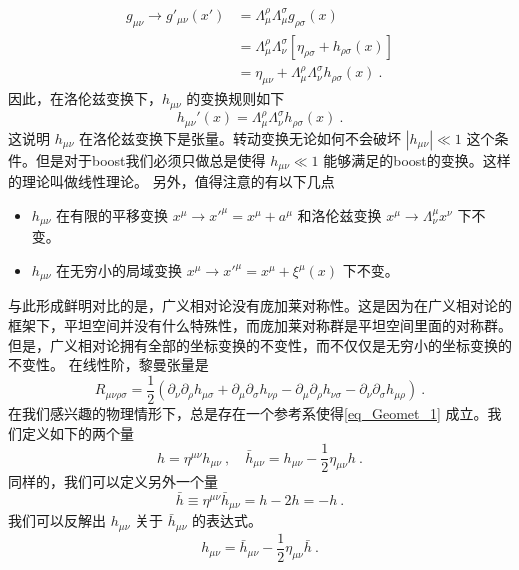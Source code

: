 \begin{equation} 
\begin{aligned}
g_{\mu\nu} \rightarrow g'_{\mu\nu} (x') & = \Lambda^\rho_\mu \Lambda^\sigma_\mu g_{\rho\sigma} (x) \\ 
& = \Lambda^\rho_\mu \Lambda^\sigma_\nu [\eta_{\rho\sigma} + h_{\rho\sigma}(x)] \\
& = \eta_{\mu\nu} + \Lambda^\rho_\mu \Lambda^\sigma_\nu h_{\rho\sigma} (x) ~.
\end{aligned}
\end{equation}
因此，在洛伦兹变换下，$h_{\mu\nu}$ 的变换规则如下
\begin{equation}
h_{\mu\nu}'(x) = \Lambda^\rho_\mu\Lambda^\sigma_\nu h_{\rho\sigma} (x) ~. 
\end{equation}
这说明 $h_{\mu\nu}$ 在洛伦兹变换下是张量。转动变换无论如何不会破坏 $|h_{\mu\nu}|\ll 1$ 这个条件。但是对于boost我们必须只做总是使得 $h_{\mu\nu}\ll 1$ 能够满足的boost的变换。这样的理论叫做线性理论。
另外，值得注意的有以下几点
\begin{itemize}
\item $h_{\mu\nu}$ 在有限的平移变换 $x^\mu\rightarrow x'^\mu = x^\mu + a^\mu$ 和洛伦兹变换 $x^\mu\rightarrow \Lambda^\mu_\nu x^\nu$ 下不变。
\item $h_{\mu\nu}$ 在无穷小的局域变换 $x^\mu \rightarrow x'^\mu = x^\mu + \xi^\mu (x)$ 下不变。
\end{itemize}
与此形成鲜明对比的是，广义相对论没有庞加莱对称性。这是因为在广义相对论的框架下，平坦空间并没有什么特殊性，而庞加莱对称群是平坦空间里面的对称群。但是，广义相对论拥有全部的坐标变换的不变性，而不仅仅是无穷小的坐标变换的不变性。
在线性阶，黎曼张量是
\begin{equation}
R_{\mu\nu\rho\sigma} = \frac{1}{2}  (\partial_\nu\partial_\rho h_{\mu\sigma} + \partial_\mu\partial_\sigma h_{\nu\rho} - \partial_\mu\partial_\rho h_{\nu\sigma} - \partial_\nu\partial_\sigma h_{\mu\rho}  ) ~.
\end{equation} 
在我们感兴趣的物理情形下，总是存在一个参考系使得\autoref{eq_Geomet_1} 成立。我们定义如下的两个量 
\begin{equation}
h = \eta^{\mu\nu} h_{\mu\nu} ~, \quad \bar h_{\mu\nu} = h_{\mu\nu} - \frac{1}{2} \eta_{\mu\nu} h~.
\end{equation}
同样的，我们可以定义另外一个量
\begin{equation}
\bar h \equiv \eta^{\mu\nu} \bar h_{\mu\nu} = h - 2 h = -h~.
\end{equation}
我们可以反解出 $h_{\mu\nu}$ 关于 $\bar h_{\mu\nu}$ 的表达式。
\begin{equation}
h_{\mu\nu} = \bar h_{\mu\nu} - \frac{1}{2} \eta_{\mu\nu} \bar h ~. 
\end{equation}
